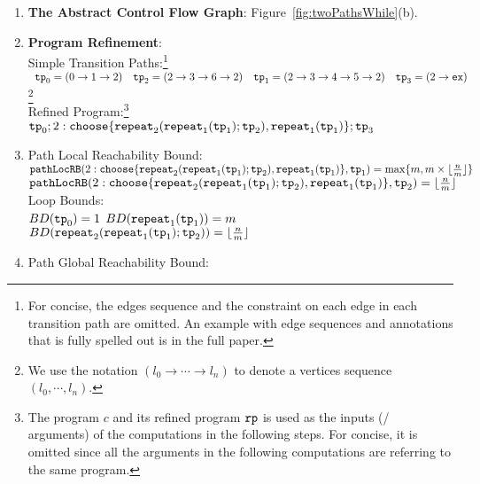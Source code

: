 \begin{enumerate}
  \item  \textbf{The Abstract Control Flow Graph}: Figure~\ref{fig:twoPathsWhile}(b).

  \item \textbf{Program Refinement}:
  \\
  {Simple Transition Paths:\footnote{For concise, the edges sequence and the constraint on each edge in
  each transition path are omitted.
  An example with edge sequences and annotations that is fully spelled out is in the full paper.}}
  \\
$
\begin{array}{llll}
  \mathtt{tp}_0 = (0 \to 1 \to 2)
  &
  \mathtt{tp}_2 = (2 \to 3 \to 6 \to 2)
  &
  \mathtt{tp}_1 = (2 \to 3 \to 4 \to 5 \to 2)
  &
  \mathtt{tp}_3 = (2 \to \mathtt{ex})
  \end{array}
$\footnote{We use the notation $(l_0 \to \cdots \to l_n)$ to denote a vertices sequence $(l_0, \cdots, l_n)$.}
\\
{Refined Program:\footnote{The program $c$ and its refined program $\mathtt{rp}$ is used as the inputs (/ arguments) of the computations in the following steps.
For concise, it is omitted since all the arguments in the following computations are referring to the same program.}}
\\
$
  \tpath_0 ; 
  2: \rpchoose{\rprepeat_2(\rprepeat_1(\tpath_1); \tpath_2) , 
  \rprepeat_1(\tpath_1) }; \tpath_3
$
%
\item {Path Local Reachability Bound}:
\\
$\outinB(2 :\rpchoose{\rprepeat_2(\rprepeat_1(\tpath_1); \tpath_2) , 
\rprepeat_1(\tpath_1) } , \tpath_1) = \max\{m, m \times \lfloor\frac{n}{m}\rfloor\}$ 
\\
$\outinB(2: \rpchoose{\rprepeat_2(\rprepeat_1(\tpath_1); \tpath_2) , 
\rprepeat_1(\tpath_1) }, \tpath_2) = \lfloor\frac{n}{m}\rfloor$ 
%
\\
Loop Bounds:
\\
     $ BD(\mathtt{tp}_0) = 1$
      \quad
      $BD(\mathtt{repeat}_1(\mathtt{tp}_1)) = m $
      \quad
      $BD(\mathtt{repeat}_2(\mathtt{repeat}_1(\mathtt{tp}_1); \mathtt{tp}_2)) = \lfloor\frac{n}{m}\rfloor$
%
\item Path Global Reachability Bound:

\end{enumerate}
